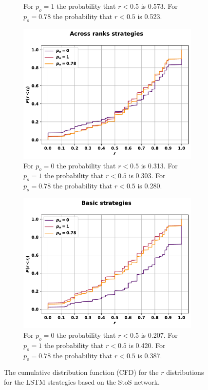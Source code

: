 \begin{figure}[!htbp]
\begin{subfigure}{.45\textwidth}
{    For \(p_o=1\) the probability that \(r<0.5\) is 0.573.
    For \(p_o=0.78\) the probability that \(r<0.5\) is 0.523.}
    \end{subfigure}
    \begin{subfigure}{.45\textwidth}
    \includegraphics[width=\textwidth]{src/chapters/07/img/cfd_to_sequence_across_ranks_strategies.pdf}
    \caption{For \(p_o=0\) the probability that \(r<0.5\) is 0.313.
    For \(p_o=1\) the probability that \(r<0.5\) is 0.303.
    For \(p_o=0.78\) the probability that \(r<0.5\) is 0.280.}
    \end{subfigure}\hfill
    \begin{subfigure}{.45\textwidth}
    \includegraphics[width=\textwidth]{src/chapters/07/img/cfd_to_sequence_basic_strategies.pdf}
    \caption{For \(p_o=0\) the probability that \(r<0.5\) is 0.207.
    For \(p_o=1\) the probability that \(r<0.5\) is 0.420.
    For \(p_o=0.78\) the probability that \(r<0.5\) is 0.387.}
    \end{subfigure}
    \caption{The cumulative distribution function (CFD)
    for the \(r\) distributions for the LSTM strategies based on the StoS
    network.}\label{fig:cfd_s_to_s}
\end{figure}

